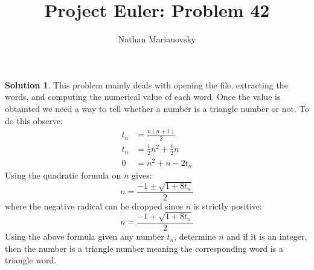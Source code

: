 \documentclass[12pt, letterpaper, onecolumn, conference, final]{IEEEtran}
\title{Project Euler: Problem 42}
\author{Nathan Marianovsky}
\theoremstyle{definition}
\newtheorem*{problem*}{Problem}
\newtheorem*{solution*}{Solution}
\theoremstyle{plain}
\begin{document}
\maketitle

\begin{center}
\end{center}

\vspace{.3cm}
\begin{solution*}
This problem mainly deals with opening the file, extracting the words, and computing the numerical value of each word. Once the value is obtainted we need a way to tell whether a number is a triangle number or not. To do this observe:
\begin{equation*}
\begin{split}
t_n &= \frac{n(n+1)}{2} \\
t_n &= \frac{1}{2}n^2 + \frac{1}{2}n \\
0 &= n^2 + n - 2t_n
\end{split}
\end{equation*}
Using the quadratic formula on $n$ gives:
\begin{equation*}
n = \frac{-1 \pm \sqrt{1 + 8t_n}}{2}
\end{equation*}
where the negative radical can be dropped since $n$ is strictly positive:
\begin{equation*}
n = \frac{-1 + \sqrt{1 + 8t_n}}{2}
\end{equation*}
Using the above formula given any number $t_n$, determine $n$ and if it is an integer, then the number is a triangle number meaning the corresponding word is a triangle word.
\end{solution*}
\end{document}
